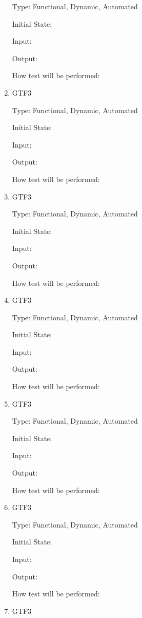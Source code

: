 \documentclass[12pt, titlepage]{article}
\begin{document}
\begin{enumerate}
Type: Functional, Dynamic, Automated
					
Initial State: 
					
Input: 
					
Output: 

How test will be performed: 

\item{GTF3\\}

Type: Functional, Dynamic, Automated
					
Initial State: 
					
Input: 
					
Output: 

How test will be performed: 
\item{GTF3\\}

Type: Functional, Dynamic, Automated
					
Initial State: 
					
Input: 
					
Output: 

How test will be performed: 

\item{GTF3\\}

Type: Functional, Dynamic, Automated
					
Initial State: 
					
Input: 
					
Output: 

How test will be performed: 

\item{GTF3\\}

Type: Functional, Dynamic, Automated
					
Initial State: 
					
Input: 
					
Output: 

How test will be performed: 

\item{GTF3\\}

Type: Functional, Dynamic, Automated
					
Initial State: 
					
Input: 
					
Output: 

How test will be performed: 

\item{GTF3\\}


\end{enumerate}
\end{document}
